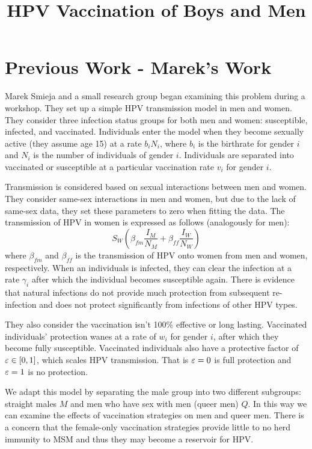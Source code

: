 \documentclass[12pt]{article}
\title{HPV Vaccination of Boys and Men}
\begin{document}
\maketitle

\section*{Previous Work - Marek's Work}

Marek Smieja and a small research group began examining this problem during a workshop.  They set up a simple HPV transmission model in men and women.  They consider three infection status groups for both men and women: susceptible, infected, and vaccinated.  Individuals enter the model when they become sexually active (they assume age 15) at a rate $b_iN_i$, where $b_i$ is the birthrate for gender $i$ and $N_i$ is the number of individuals of gender $i$.  Individuals are separated into vaccinated or susceptible at a particular vaccination rate $v_i$ for gender $i$.  

Transmission is considered based on sexual interactions between men and women.  They consider same-sex interactions in men and women, but due to the lack of same-sex data, they set these parameters to zero when fitting the data.  The transmission of HPV in women is expressed as follows (analogously for men):
\begin{equation}
S_{W}\left(\beta_{fm}\frac{I_M}{N_M} + \beta_{ff}\frac{I_W}{N_W}\right)
\end{equation}
where $\beta_{fm}$ and $\beta_{ff}$ is the transmission of HPV onto women from men and women, respectively.  When an individuals is infected, they can clear the infection at a rate $\gamma_i$ after which the individual becomes susceptible again.  There is evidence that natural infections do not provide much protection from subsequent re-infection and does not protect significantly from infections of other HPV types.  

They also consider the vaccination isn't 100\% effective or long lasting. Vaccinated individuals' protection wanes at a rate of $w_i$ for gender $i$, after which they become fully susceptible.  Vaccinated individuals also have a protective factor of $\varepsilon\in[0,1]$, which scales HPV transmission.  That is $\varepsilon=0$ is full protection and $\varepsilon=1$ is no protection.  

We adapt this model by separating the male group into two different subgroups: straight males $M$ and men who have sex with men (queer men) $Q$. In this way we can examine the effects of vaccination strategies on men and queer men.  There is a concern that the female-only vaccination strategies provide little to no herd immunity to MSM and thus they may become a reservoir for HPV. 
\end{document}
